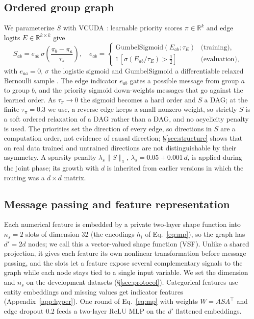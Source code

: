 \documentclass[anon,12pt]{clear2027} %
\newcommand{\R}{\mathbb{R}}
\newcommand{\T}{^{\top}}
\begin{document}
\subsection{Ordered group graph}
\label{sec:vcuda}
We parameterize $S$ with VCUDA \citep{hoang2024vcuda}: learnable priority scores $\pi\in\R^k$ and edge logits $E\in\R^{k\times k}$ give
\begin{equation}
S_{ab} = e_{ab}\, \sigma\!\left(\frac{\pi_b-\pi_a}{\tau_\pi}\right),\quad
e_{ab} = \begin{cases}
\mathrm{GumbelSigmoid}(E_{ab};\tau_E) & \text{(training)},\\
\mathbb{1}\!\left[\sigma(E_{ab}/\tau_E)>\tfrac12\right] & \text{(evaluation)},
\end{cases}
\label{eq:vcuda}
\end{equation}
with $e_{aa}=0$, $\sigma$ the logistic sigmoid and $\mathrm{GumbelSigmoid}$ a differentiable relaxed Bernoulli sample \citep{jang2017gumbel}. The edge indicator $e_{ab}$ gates a possible message from group $a$ to group $b$, and the priority sigmoid down-weights messages that go against the learned order. As $\tau_\pi\to0$ the sigmoid becomes a hard order and $S$ a DAG; at the finite $\tau_\pi=0.3$ we use, a reverse edge keeps a small nonzero weight, so strictly $S$ is a soft ordered relaxation of a DAG rather than a DAG, and no acyclicity penalty is used. The priorities set the direction of every edge, so directions in $S$ are a computation order, not evidence of causal direction; \S\ref{sec:structure} shows that on real data trained and untrained directions are not distinguishable by their asymmetry. A sparsity penalty $\lambda_s\|S\|_1$, $\lambda_s = 0.05+0.001\,d$, is applied during the joint phase; its growth with $d$ is inherited from earlier versions in which the routing was a $d\times d$ matrix.

\subsection{Message passing and feature representation}
\label{sec:mp}
Each numerical feature is embedded by a private two-layer shape function \citep{agarwal2021nam} into $n_s=2$ slots of dimension $32$ (the encodings $h_i$ of Eq.~\eqref{eq:mp}), so the graph has $d'=2d$ nodes; we call this a vector-valued shape function (VSF). Unlike a shared projection, it gives each feature its own nonlinear transformation before message passing, and the slots let a feature expose several complementary signals to the graph while each node stays tied to a single input variable. We set the dimension and $n_s$ on the development datasets (\S\ref{sec:protocol}). Categorical features use entity embeddings and missing values get indicator features (Appendix~\ref{app:hyper}). One round of Eq.~\eqref{eq:mp} with weights $W=ASA\T$ and edge dropout $0.2$ feeds a two-layer ReLU MLP on the $d'$ flattened embeddings.
\end{document}
